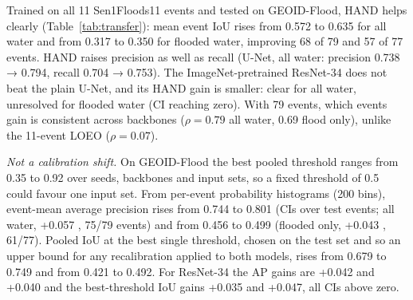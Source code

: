 \begin{table}[t]
\caption{Trained on all 11 Sen1Floods11 events (5 seeds), tested on GEOID-Flood test. Mean event IoU, SAR →
SAR + HAND; paired Δ with two-way 95\% CI over seeds and events; Wilcoxon $p$ over events.}
\label{tab:transfer}
\centering
\footnotesize
\setlength{\tabcolsep}{2.5pt}
\end{table}

Trained on all 11 Sen1Floods11 events and tested on GEOID-Flood, HAND helps clearly
(Table~\ref{tab:transfer}): mean event IoU rises from 0.572 to 0.635 for all water and from 0.317 to 0.350
for flooded water, improving 68 of 79 and 57 of 77 events. HAND raises precision as well as recall (U-Net,
all water: precision 0.738 → 0.794, recall 0.704 → 0.753). The ImageNet-pretrained ResNet-34 does not beat
the plain U-Net, and its HAND gain is smaller: clear for all water, unresolved for flooded water (CI
reaching zero). With 79 events, which events gain is consistent across backbones ($\rho = 0.79$ all water,
0.69 flood only), unlike the 11-event LOEO ($\rho = 0.07$).

\emph{Not a calibration shift.} On GEOID-Flood the best pooled threshold ranges from 0.35 to 0.92 over
seeds, backbones and input sets, so a fixed threshold of 0.5 could favour one input set. From per-event
probability histograms (200 bins), event-mean average precision rises from 0.744 to 0.801 (CIs over test
events; all water, +0.057 , 75/79 events) and from 0.456 to 0.499 (flooded only,
+0.043 , 61/77). Pooled IoU at the best single threshold, chosen on the test set and
so an upper bound for any recalibration applied to both models, rises from 0.679 to 0.749 and from 0.421
to 0.492. For ResNet-34 the AP gains are +0.042 and +0.040 and the best-threshold IoU gains +0.035 and
+0.047, all CIs above zero.

